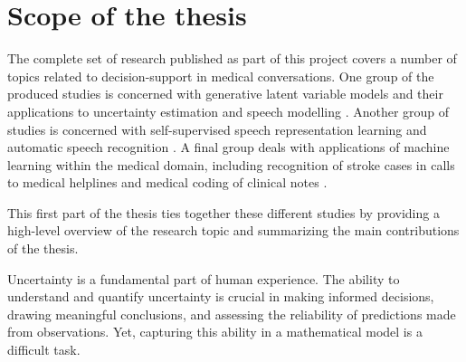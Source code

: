 

\section{Scope of the thesis}
%
%
The complete set of research published as part of this project covers a number of topics related to decision-support in medical conversations. 
One group of the produced studies is concerned with generative latent variable models and their applications to uncertainty estimation and speech modelling \cite{havtorn_hierarchical_2021,havtorn_benchmarking_2022,bergamin_modelagnostic_2022}. 
Another group of studies is concerned with self-supervised speech representation learning and automatic speech recognition \cite{borgholt_scaling_2021,borgholt_we_2021,mohamed_selfsupervised_2022,borgholt_brief_2022}. 
A final group deals with applications of machine learning within the medical domain, including recognition of stroke cases in calls to medical helplines \cite{wenstrup_retrospective_2023} and medical coding of clinical notes \cite{edin_automated_2023}. 

This first part of the thesis ties together these different studies by providing a high-level overview of the research topic and summarizing the main contributions of the thesis.























\iffalse


Uncertainty is a fundamental part of human experience. The ability to understand and quantify uncertainty is crucial in making informed decisions, drawing meaningful conclusions, and assessing the reliability of predictions made from observations. Yet, capturing this ability in a mathematical model is a difficult task. 

